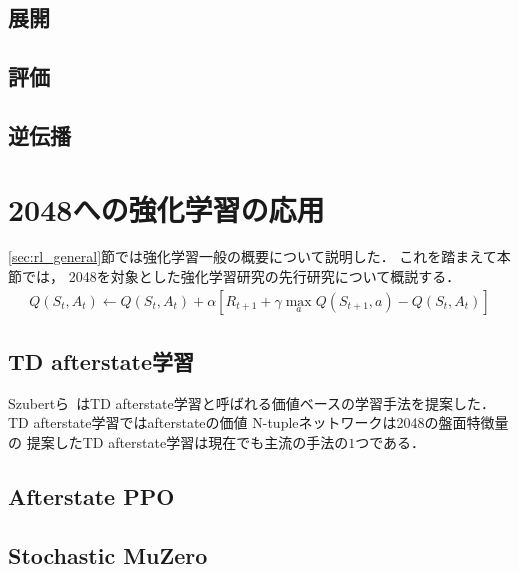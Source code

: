 \subsection*{展開}
\subsection*{評価}
\subsection*{逆伝播}

\section{2048への強化学習の応用}
\ref{sec:rl_general}節では強化学習一般の概要について説明した．
これを踏まえて本節では， 2048を対象とした強化学習研究の先行研究について概説する．
\begin{align}
  \label{eq:td_afterstate}
  Q(S_t, A_t) \leftarrow Q(S_t, A_t) + \alpha [R_{t+1} + \gamma \max_a Q(S_{t+1}, a) - Q(S_t, A_t)]
\end{align}


\subsection{TD afterstate学習}
Szubertら~\cite{Szubert}はTD afterstate学習と呼ばれる価値ベースの学習手法を提案した．
TD afterstate学習ではafterstateの価値
N-tupleネットワークは2048の盤面特徴量の
提案したTD afterstate学習は現在でも主流の手法の$1$つである．


\subsection{Afterstate PPO}

\subsection{Stochastic MuZero}
